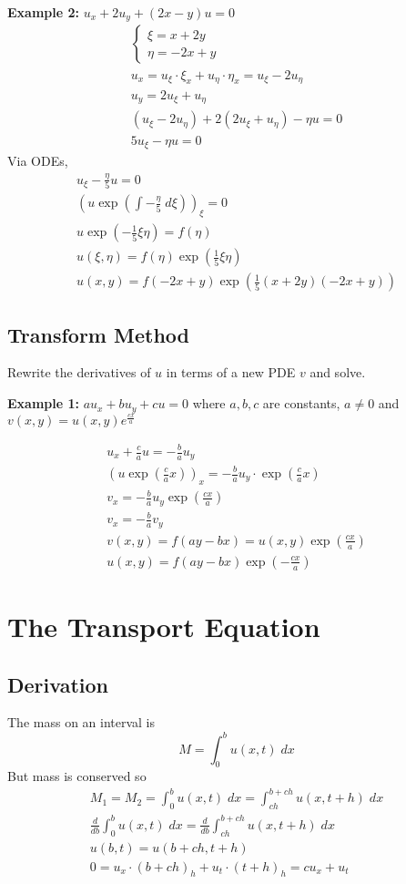 \documentclass[10pt]{article}
\begin{document}
\textbf{Example 2:} $u_x + 2u_y + (2x - y)u = 0$
\begin{gather*}
    \begin{cases*}
        \xi = x + 2y\\
        \eta = -2x + y
    \end{cases*}\\
    u_x = u_\xi \cdot \xi_x + u_\eta\cdot \eta_x = u_\xi - 2u_\eta\\
    u_y = 2u_\xi + u_\eta\\
    (u_\xi - 2u_\eta) + 2(2u_\xi + u_\eta) -\eta u = 0\\
    5u_\xi - \eta u = 0
\end{gather*}
Via ODEs, 
\begin{gather*}
    u_\xi - \frac{\eta}{5}u = 0\\
    (u\exp(\int -\frac{\eta}{5}\; d\xi))_\xi = 0\\
    u\exp(-\frac{1}{5}\xi \eta) = f(\eta)\\
    u(\xi, \eta) = f(\eta)\exp(\frac{1}{5}\xi \eta)\\
    u(x, y) = f(-2x + y) \exp(\frac{1}{5}(x + 2y)(-2x + y))
\end{gather*}

\subsection{Transform Method}
Rewrite the derivatives of $u$ in terms of a new PDE $v$ and solve. 

\textbf{Example 1:} $au_x + bu_y + cu =0$ where $a, b, c$ are constants, $a \neq 0$ and $v(x, y) = u(x, y)e^{\frac{cx}{a}}$

\begin{gather*}
    u_x + \frac{c}{a}u = -\frac{b}{a}u_y\\
    (u\exp(\frac{c}{a}x))_x = - \frac{b}{a}u_y \cdot \exp(\frac{c}{a}x)\\
    v_x = -\frac{b}{a}u_y \exp(\frac{cx}{a})\\
    v_x = -\frac{b}{a}v_y\\
    v(x, y) = f(ay - bx) = u(x, y) \exp(\frac{cx}{a})\\
    u(x, y) = f(ay - bx)\exp(-\frac{cx}{a})
\end{gather*}

\section{The Transport Equation}
\subsection{Derivation}
The mass on an interval is 
\[M= \int_0^b u(x, t)\; dx\]
But mass is conserved so 
\begin{gather*}
    M_1 = M_2 = \int_0^b u(x, t)\; dx = \int_{ch}^{b + ch}u(x, t+ h)\; dx\\
    \frac{d}{db}\int_0^b u(x, t)\; dx = \frac{d}{db} \int_{ch}^{b +ch} u(x, t + h)\; dx\\
    u(b, t) = u(b+ ch, t+ h)\\
    0 = u_x \cdot (b+ch)_h + u_t \cdot (t+h)_h = cu_x + u_t\\
\end{gather*}
\end{document}
